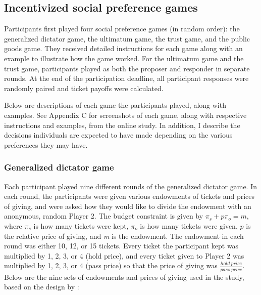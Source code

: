 \documentclass[12pt]{article}
\begin{document}
\subsection{Incentivized social preference games}


Participants first played four social preference games (in random order): the generalized dictator game, the ultimatum game, the trust game, and the public goods game. They received detailed instructions for each game along with an example to illustrate how the game worked. For the ultimatum game and the trust game, participants played as both the proposer and responder in separate rounds. At the end of the participation deadline, all participant responses were randomly paired and ticket payoffs were calculated.

Below are descriptions of each game the participants played, along with examples. See Appendix C for screenshots of each game, along with respective instructions and examples, from the online study. In addition, I describe the decisions individuals are expected to have made depending on the various preferences they may have.

\subsubsection{Generalized dictator game}

Each participant played nine different rounds of the generalized dictator game. In each round, the participants were given various endowments of tickets and prices of giving, and were asked how they would like to divide the endowment with an anonymous, random Player 2. The budget constraint is given by \(\pi_{s} + p\pi_{o} = \textit{m}\), where \(\pi_{s}\) is how many tickets were kept, \(\pi_{o}\) is how many tickets were given, \(p\) is the relative price of giving, and \textit{m} is the endowment. The endowment in each round was either 10, 12, or 15 tickets. Every ticket the participant kept was multiplied by 1, 2, 3, or 4 (hold price), and every ticket given to Player 2 was multiplied by 1, 2, 3, or 4 (pass price) so that the price of giving was \(\frac{hold \ price}{pass \ price}\). Below are the nine sets of endowments and prices of giving used in the study, based on the design by \cite{andreoni_miller_2002}:
\end{document}
